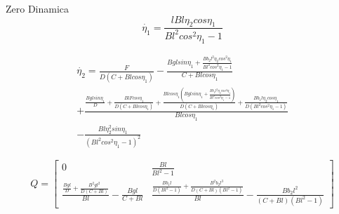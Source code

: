 \documentclass[a4paper]{article}
\begin{document}
Zero Dinamica
\begin{equation}
\dot{\eta_1} = \frac{lB l \eta_2 cos\eta_1}{B l^2 cos^2 \eta_1 - 1} 
\end{equation}

\begin{multline*}
\dot{\eta_2} = \frac{F}{D (C + B l cos\eta_1)} - 
\frac{B g l sin\eta_1 + \frac{B b_2 l^2 \eta_2 cos^2 \eta_1}{B l^2 cos^2 \eta_1 - 1}}{C + B l cos\eta_1} \\
+ \frac{\frac{B g l sin\eta_1}{D} + \frac{B l F cos\eta_1}{D (C + B l cos\eta_1)} + \frac{B l cos\eta_1 (B g l sin\eta_1 + \frac{B b_2 l^2 \eta_2 cos^2\eta_1}{B l^2 cos^2 \eta_1 -1})}{D (C + B l cos\eta_1)} + \frac{B b_1 l \eta_2 cos\eta_1}{D (B l^2 cos^2\eta_1 -1)}}{B l cos\eta_1} \\
- \frac{B l \eta_2^2 sin\eta_1}{(B l^2 cos^2\eta_1 -1)^2}
\end{multline*}

\begin{equation}
Q = 
\begin{bmatrix}
0 & \frac{B l}{B l^2 -1} \\
\frac{\frac{B g l}{D} + \frac{B^2 g l^2}{D (C + B l)}}{B l} - \frac{B g l}{C + B l} & \frac{\frac{B b_1 l}{D (B l^2 -1)} + \frac{B^2 b_2 l^3}{D(C + B l)(B l^2 -1)}}{B l} - \frac{B b_2 l^2}{(C + B l)(B l^2 -1)}
\end{bmatrix}
\end{equation}
\end{document}
